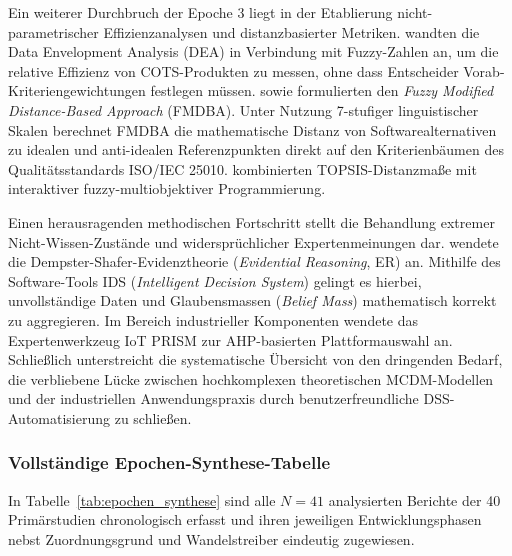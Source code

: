 Ein weiterer Durchbruch der Epoche 3 liegt in der Etablierung nicht-parametrischer Effizienzanalysen und distanzbasierter Metriken. \cite{YVWGHAWQ} wandten die Data Envelopment Analysis (DEA) in Verbindung mit Fuzzy-Zahlen an, um die relative Effizienz von COTS-Produkten zu messen, ohne dass Entscheider Vorab-Kriteriengewichtungen festlegen müssen. \cite{9BLXY3EP} sowie \cite{FVINCQ89} formulierten den \textit{Fuzzy Modified Distance-Based Approach} (FMDBA). Unter Nutzung 7-stufiger linguistischer Skalen berechnet FMDBA die mathematische Distanz von Softwarealternativen zu idealen und anti-idealen Referenzpunkten direkt auf den Kriterienbäumen des Qualitätsstandards ISO/IEC 25010. \cite{8KF4HAZS} kombinierten TOPSIS-Distanzmaße mit interaktiver fuzzy-multiobjektiver Programmierung.

Einen herausragenden methodischen Fortschritt stellt die Behandlung extremer Nicht-Wissen-Zustände und widersprüchlicher Expertenmeinungen dar. \cite{LNQHES84} wendete die Dempster-Shafer-Evidenztheorie (\textit{Evidential Reasoning}, ER) an. Mithilfe des Software-Tools IDS (\textit{Intelligent Decision System}) gelingt es hierbei, unvollständige Daten und Glaubensmassen (\textit{Belief Mass}) mathematisch korrekt zu aggregieren. Im Bereich industrieller Komponenten wendete \cite{RRU375GB} das Expertenwerkzeug IoT PRISM zur AHP-basierten Plattformauswahl an. Schließlich unterstreicht die systematische Übersicht von \cite{LPC92LAP} den dringenden Bedarf, die verbliebene Lücke zwischen hochkomplexen theoretischen MCDM-Modellen und der industriellen Anwendungspraxis durch benutzerfreundliche DSS-Automatisierung zu schließen.

\subsubsection{Vollständige Epochen-Synthese-Tabelle}

In Tabelle~\ref{tab:epochen_synthese} sind alle $N = 41$ analysierten Berichte der 40 Primärstudien chronologisch erfasst und ihren jeweiligen Entwicklungsphasen nebst Zuordnungsgrund und Wandelstreiber eindeutig zugewiesen.

